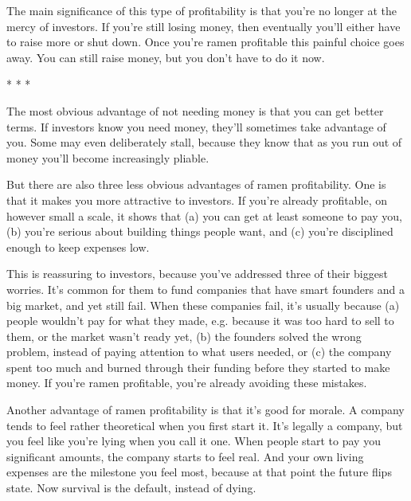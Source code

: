 The main
                    significance of this type of profitability is that you're no
                    longer at the mercy of investors. If you're still losing
                    money, then eventually you'll either have to raise more or
                    shut down. Once you're ramen profitable this painful choice
                    goes away. You can still raise money, but you don't have to
                    do it now.


                    
* * *
                    

The most obvious advantage of not needing money
                    is that you can get better terms. If investors know you need
                    money, they'll sometimes take advantage of you. Some may
                    even deliberately stall, because they know that as you run
                    out of money you'll become increasingly pliable.

But
                    there are also three less obvious advantages of ramen
                    profitability. One is that it makes you more attractive to
                    investors. If you're already profitable, on however small a
                    scale, it shows that (a) you can get at least someone to pay
                    you, (b) you're serious about building things people want,
                    and (c) you're disciplined enough to keep expenses low.

This
                    is reassuring to investors, because you've addressed three
                    of their biggest worries. It's common for them to fund
                    companies that have smart founders and a big market, and yet
                    still fail. When these companies fail, it's usually because
                    (a) people wouldn't pay for what they made, e.g. because it
                    was too hard to sell to them, or the market wasn't ready
                    yet, (b) the founders solved the wrong problem, instead of
                    paying attention to what users needed, or (c) the company
                    spent too much and burned through their funding before they
                    started to make money. If you're ramen profitable, you're
                    already avoiding these mistakes.

Another
                    advantage of ramen profitability is that it's good for
                    morale. A company tends to feel rather theoretical when you
                    first start it. It's legally a company, but you feel like
                    you're lying when you call it one. When people start to pay
                    you significant amounts, the company starts to feel real.
                    And your own living expenses are the milestone you feel
                    most, because at that point the future flips state. Now
                    survival is the default, instead of dying.

